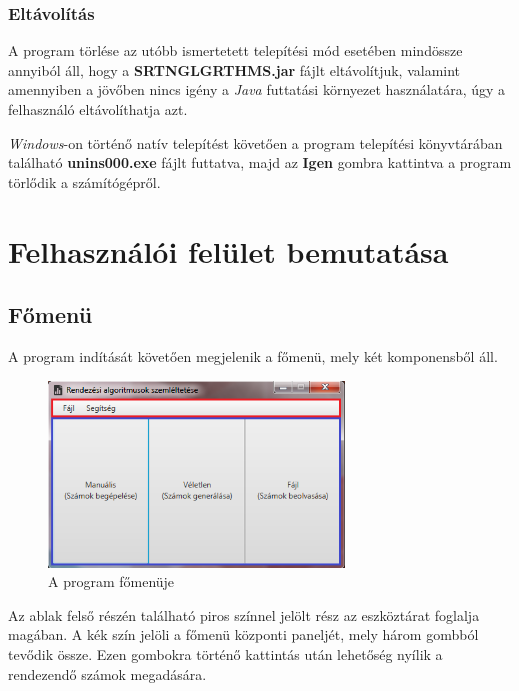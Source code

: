 \documentclass{elteikthesis}
\begin{document}
\subsubsection{Eltávolítás}
A program törlése az utóbb ismertetett telepítési mód esetében mindössze annyiból áll, hogy a \textbf{SRTNGLGRTHMS.jar} fájlt eltávolítjuk, valamint amennyiben a jövőben nincs igény a \emph{Java} futtatási környezet használatára, úgy a felhasználó eltávolíthatja azt.\par
\emph{Windows}-on történő natív telepítést követően a program telepítési könyvtárában található \textbf{unins000.exe} fájlt futtatva, majd az \textbf{Igen} gombra kattintva a program törlődik a számítógépről.

\section{Felhasználói felület bemutatása}
\subsection{Főmenü}
A program indítását követően megjelenik a főmenü, mely két komponensből áll.\par
\begin{figure}[H]
	\centering
	\includegraphics[width=0.7\textwidth]{pics/mainmenu.png}
	\caption{A program főmenüje}
\end{figure}
  Az ablak felső részén található piros színnel jelölt rész az eszköztárat foglalja magában. A kék szín jelöli a főmenü központi paneljét, mely három gombból tevődik össze. Ezen gombokra történő kattintás után lehetőség nyílik a rendezendő számok megadására.
\end{document}
